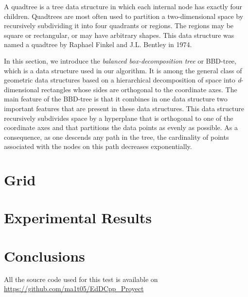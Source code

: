 \documentclass[ijoc,nonblindrev]{informs3} %
\begin{document}
A quadtree is a tree data structure in which each internal node has exactly four children. 
Quadtrees are most often used to partition a two-dimensional space by recursively 
subdividing it into four quadrants or regions. 
The regions may be square or rectangular, or may have arbitrary shapes. 
This data structure was named a quadtree by Raphael Finkel and J.L. Bentley in 1974. 

In this section, we introduce the \textit{balanced box-decomposition tree} or BBD-tree,
which is a data structure used in our algorithm. 
It is among the general class of geometric data structures based on a hierarchical decomposition of space
into \textit{d}-dimensional rectangles whose sides are orthogonal to the coordinate axes.
The main feature of the BBD-tree is that it combines in one data structure two
important features that are present in these data structures.
This data structure recursively subdivides space by a hyperplane that is orthogonal to one
of the coordinate axes and that partitions the data points as evenly as possible.
As a consequence, as one descends any path in the tree, the cardinality of points
associated with the nodes on this path decreases exponentially.

\section{Grid}


\section{Experimental Results}
\section{Conclusions}
All the soucre code used for this test is available on
\url{https://github.com/ma1t05/EdDCpp_Proyect}



%
%
%
\end{document}
